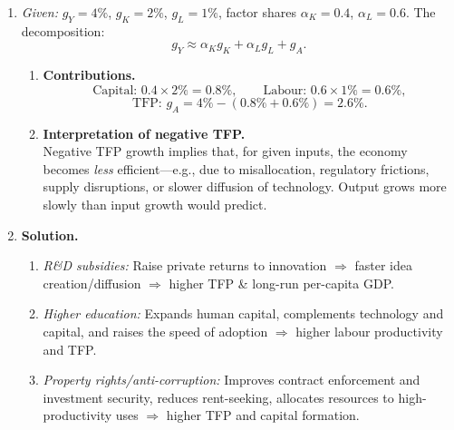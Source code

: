 \documentclass[12pt]{article}
\begin{document}
\begin{enumerate}[label=\textbf{\arabic*.}, leftmargin=1.5em]
\begin{enumerate}[label=(\alph*)]
\item \textbf{Why $<10\%$?}\\
Diminishing marginal returns to capital: holding $L$ and $A$ fixed, each additional unit of $K$ raises output by less than the previous one. Hence, a 10\% increase in $K$ yields only about a 3\% increase in $Y$.
\end{enumerate}

\vspace{0.75em}

\item \emph{Given:} $g_Y = 4\%$, $g_K = 2\%$, $g_L = 1\%$, factor shares $\alpha_K=0.4$, $\alpha_L=0.6$. The decomposition:
\[
g_Y \approx \alpha_K g_K + \alpha_L g_L + g_A.
\]
\begin{enumerate}[label=(\alph*)]
\item \textbf{Contributions.}
\[
\text{Capital: } 0.4 \times 2\% = \mathbf{0.8\%}, \qquad
\text{Labour: } 0.6 \times 1\% = \mathbf{0.6\%},
\]
\[
\text{TFP: } g_A = 4\% - (0.8\% + 0.6\%) = \mathbf{2.6\%}.
\]
\item \textbf{Interpretation of negative TFP.}\\
Negative TFP growth implies that, for given inputs, the economy becomes \emph{less} efficient---e.g., due to misallocation, regulatory frictions, supply disruptions, or slower diffusion of technology. Output grows more slowly than input growth would predict.
\end{enumerate}

\vspace{0.75em}

\item \textbf{Solution.}
\begin{enumerate}[label=(\alph*)]
\item \emph{R\&D subsidies:} Raise private returns to innovation $\Rightarrow$ faster idea creation/diffusion $\Rightarrow$ higher TFP \& long-run per-capita GDP.
\item \emph{Higher education:} Expands human capital, complements technology and capital, and raises the speed of adoption $\Rightarrow$ higher labour productivity and TFP.
\item \emph{Property rights/anti-corruption:} Improves contract enforcement and investment security, reduces rent-seeking, allocates resources to high-productivity uses $\Rightarrow$ higher TFP and capital formation.
\end{enumerate}

\end{enumerate}
\end{document}
